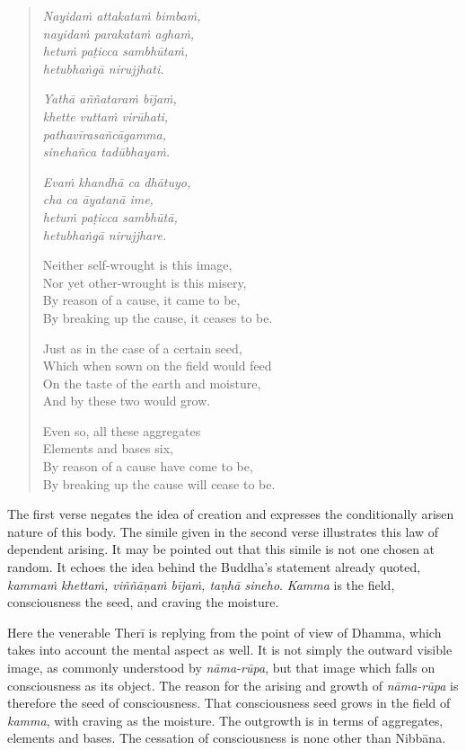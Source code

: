 \begin{quote}
\emph{Nayidaṁ attakataṁ bimbaṁ,}\\
\emph{nayidaṁ parakataṁ aghaṁ,}\\
\emph{hetuṁ paṭicca sambhūtaṁ,}\\
\emph{hetubhaṅgā nirujjhati.}

\emph{Yathā aññataraṁ bījaṁ,}\\
\emph{khette vuttaṁ virūhati,}\\
\emph{pathavīrasañcāgamma,}\\
\emph{sinehañca tadūbhayaṁ.}

\emph{Evaṁ khandhā ca dhātuyo,}\\
\emph{cha ca āyatanā ime,}\\
\emph{hetuṁ paṭicca sambhūtā,}\\
\emph{hetubhaṅgā nirujjhare.}

Neither self-wrought is this image,\\
Nor yet other-wrought is this misery,\\
By reason of a cause, it came to be,\\
By breaking up the cause, it ceases to be.

Just as in the case of a certain seed,\\
Which when sown on the field would feed\\
On the taste of the earth and moisture,\\
And by these two would grow.

Even so, all these aggregates\\
Elements and bases six,\\
By reason of a cause have come to be,\\
By breaking up the cause will cease to be.
\end{quote}

The first verse negates the idea of creation and expresses the conditionally arisen nature of this body. The simile given in the second verse illustrates this law of dependent arising. It may be pointed out that this simile is not one chosen at random. It echoes the idea behind the Buddha's statement already quoted, \emph{kammaṁ khettaṁ, viññāṇaṁ bījaṁ, taṇhā sineho}. \emph{Kamma} is the field, consciousness the seed, and craving the moisture.

Here the venerable Therī is replying from the point of view of Dhamma, which takes into account the mental aspect as well. It is not simply the outward visible image, as commonly understood by \emph{nāma-rūpa}, but that image which falls on consciousness as its object. The reason for the arising and growth of \emph{nāma-rūpa} is therefore the seed of consciousness. That consciousness seed grows in the field of \emph{kamma}, with craving as the moisture. The outgrowth is in terms of aggregates, elements and bases. The cessation of consciousness is none other than Nibbāna.

